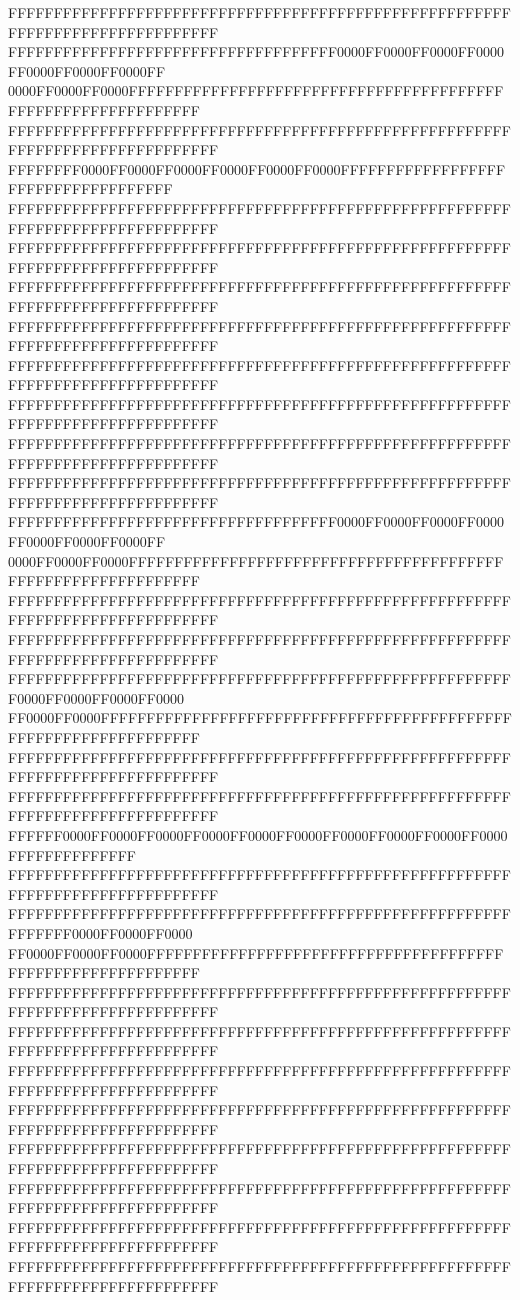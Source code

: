 FFFFFFFFFFFFFFFFFFFFFFFFFFFFFFFFFFFFFFFFFFFFFFFFFFFFFFFFFFFFFFFFFFFFFFFFFFFFFF
FFFFFFFFFFFFFFFFFFFFFFFFFFFFFFFFFFFF0000FF0000FF0000FF0000FF0000FF0000FF0000FF
0000FF0000FF0000FFFFFFFFFFFFFFFFFFFFFFFFFFFFFFFFFFFFFFFFFFFFFFFFFFFFFFFFFFFFFF
FFFFFFFFFFFFFFFFFFFFFFFFFFFFFFFFFFFFFFFFFFFFFFFFFFFFFFFFFFFFFFFFFFFFFFFFFFFFFF
FFFFFFFF0000FF0000FF0000FF0000FF0000FF0000FFFFFFFFFFFFFFFFFFFFFFFFFFFFFFFFFFFF
FFFFFFFFFFFFFFFFFFFFFFFFFFFFFFFFFFFFFFFFFFFFFFFFFFFFFFFFFFFFFFFFFFFFFFFFFFFFFF
FFFFFFFFFFFFFFFFFFFFFFFFFFFFFFFFFFFFFFFFFFFFFFFFFFFFFFFFFFFFFFFFFFFFFFFFFFFFFF
FFFFFFFFFFFFFFFFFFFFFFFFFFFFFFFFFFFFFFFFFFFFFFFFFFFFFFFFFFFFFFFFFFFFFFFFFFFFFF
FFFFFFFFFFFFFFFFFFFFFFFFFFFFFFFFFFFFFFFFFFFFFFFFFFFFFFFFFFFFFFFFFFFFFFFFFFFFFF
FFFFFFFFFFFFFFFFFFFFFFFFFFFFFFFFFFFFFFFFFFFFFFFFFFFFFFFFFFFFFFFFFFFFFFFFFFFFFF
FFFFFFFFFFFFFFFFFFFFFFFFFFFFFFFFFFFFFFFFFFFFFFFFFFFFFFFFFFFFFFFFFFFFFFFFFFFFFF
FFFFFFFFFFFFFFFFFFFFFFFFFFFFFFFFFFFFFFFFFFFFFFFFFFFFFFFFFFFFFFFFFFFFFFFFFFFFFF
FFFFFFFFFFFFFFFFFFFFFFFFFFFFFFFFFFFFFFFFFFFFFFFFFFFFFFFFFFFFFFFFFFFFFFFFFFFFFF
FFFFFFFFFFFFFFFFFFFFFFFFFFFFFFFFFFFF0000FF0000FF0000FF0000FF0000FF0000FF0000FF
0000FF0000FF0000FFFFFFFFFFFFFFFFFFFFFFFFFFFFFFFFFFFFFFFFFFFFFFFFFFFFFFFFFFFFFF
FFFFFFFFFFFFFFFFFFFFFFFFFFFFFFFFFFFFFFFFFFFFFFFFFFFFFFFFFFFFFFFFFFFFFFFFFFFFFF
FFFFFFFFFFFFFFFFFFFFFFFFFFFFFFFFFFFFFFFFFFFFFFFFFFFFFFFFFFFFFFFFFFFFFFFFFFFFFF
FFFFFFFFFFFFFFFFFFFFFFFFFFFFFFFFFFFFFFFFFFFFFFFFFFFFFFFF0000FF0000FF0000FF0000
FF0000FF0000FFFFFFFFFFFFFFFFFFFFFFFFFFFFFFFFFFFFFFFFFFFFFFFFFFFFFFFFFFFFFFFFFF
FFFFFFFFFFFFFFFFFFFFFFFFFFFFFFFFFFFFFFFFFFFFFFFFFFFFFFFFFFFFFFFFFFFFFFFFFFFFFF
FFFFFFFFFFFFFFFFFFFFFFFFFFFFFFFFFFFFFFFFFFFFFFFFFFFFFFFFFFFFFFFFFFFFFFFFFFFFFF
FFFFFF0000FF0000FF0000FF0000FF0000FF0000FF0000FF0000FF0000FF0000FFFFFFFFFFFFFF
FFFFFFFFFFFFFFFFFFFFFFFFFFFFFFFFFFFFFFFFFFFFFFFFFFFFFFFFFFFFFFFFFFFFFFFFFFFFFF
FFFFFFFFFFFFFFFFFFFFFFFFFFFFFFFFFFFFFFFFFFFFFFFFFFFFFFFFFFFFFF0000FF0000FF0000
FF0000FF0000FF0000FFFFFFFFFFFFFFFFFFFFFFFFFFFFFFFFFFFFFFFFFFFFFFFFFFFFFFFFFFFF
FFFFFFFFFFFFFFFFFFFFFFFFFFFFFFFFFFFFFFFFFFFFFFFFFFFFFFFFFFFFFFFFFFFFFFFFFFFFFF
FFFFFFFFFFFFFFFFFFFFFFFFFFFFFFFFFFFFFFFFFFFFFFFFFFFFFFFFFFFFFFFFFFFFFFFFFFFFFF
FFFFFFFFFFFFFFFFFFFFFFFFFFFFFFFFFFFFFFFFFFFFFFFFFFFFFFFFFFFFFFFFFFFFFFFFFFFFFF
FFFFFFFFFFFFFFFFFFFFFFFFFFFFFFFFFFFFFFFFFFFFFFFFFFFFFFFFFFFFFFFFFFFFFFFFFFFFFF
FFFFFFFFFFFFFFFFFFFFFFFFFFFFFFFFFFFFFFFFFFFFFFFFFFFFFFFFFFFFFFFFFFFFFFFFFFFFFF
FFFFFFFFFFFFFFFFFFFFFFFFFFFFFFFFFFFFFFFFFFFFFFFFFFFFFFFFFFFFFFFFFFFFFFFFFFFFFF
FFFFFFFFFFFFFFFFFFFFFFFFFFFFFFFFFFFFFFFFFFFFFFFFFFFFFFFFFFFFFFFFFFFFFFFFFFFFFF
FFFFFFFFFFFFFFFFFFFFFFFFFFFFFFFFFFFFFFFFFFFFFFFFFFFFFFFFFFFFFFFFFFFFFFFFFFFFFF
